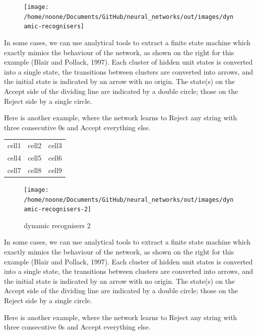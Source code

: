 \documentclass[11pt]{article}
\begin{document}
\begin{figure}[h]
    \centering
    \texttt{[image: /home/noone/Documents/GitHub/neural\_networks/out/images/dynamic-recognisers]}
    \caption{}
    \label{fig: dynamic recognisers}
\end{figure}

In some cases, we can use analytical tools to extract a finite state machine which exactly mimics the behaviour of the network, as shown on the right for this example (Blair and Pollack, 1997).
Each cluster of hidden unit states is converted into a single state, the transitions between clusters are converted into arrows, and the initial state is indicated by an arrow with no origin.
The state(s) on the Accept side of the dividing line are indicated by a double circle;
those on the Reject side by a single circle.

Here is another example, where the network learns to Reject any string with three consecutive $0$s and Accept everything else.

\begin{center}
\begin{tabular}{ |c|c|c| }
 \hline
 cell1 & cell2 & cell3 \\
 cell4 & cell5 & cell6 \\
 cell7 & cell8 & cell9 \\
 \hline
\end{tabular}
\end{center}

\begin{figure}[h]
    \centering
    \texttt{[image: /home/noone/Documents/GitHub/neural\_networks/out/images/dynamic-recognisers-2]}
    \caption{dynamic recognisers 2}
    \label{fig: dynamic recognisers 2}
\end{figure}

In some cases, we can use analytical tools to extract a finite state machine which exactly mimics the behaviour of the network, as shown on the right for this example (Blair and Pollack, 1997).
Each cluster of hidden unit states is converted into a single state, the transitions between clusters are converted into arrows, and the initial state is indicated by an arrow with no origin.
The state(s) on the Accept side of the dividing line are indicated by a double circle;
those on the Reject side by a single circle.

Here is another example, where the network learns to Reject any string with three consecutive $0$s and Accept everything else.
\end{document}
